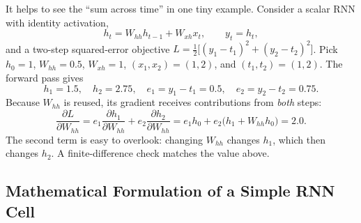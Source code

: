 \begin{tcolorbox}[summarybox, title={Numeric check: shared weights mean summed gradients}]
It helps to see the ``sum across time'' in one tiny example. Consider a scalar RNN with identity activation,
\[
h_t=W_{hh}h_{t-1}+W_{xh}x_t,\qquad y_t=h_t,
\]
and a two\hyp{}step squared\hyp{}error objective \(L=\frac{1}{2}\big[(y_1-t_1)^2+(y_2-t_2)^2\big]\).
Pick \(h_0=1\), \(W_{hh}=0.5\), \(W_{xh}=1\), \((x_1,x_2)=(1,2)\), and \((t_1,t_2)=(1,2)\). The forward pass gives
\[
h_1=1.5,\quad h_2=2.75,\quad e_1=y_1-t_1=0.5,\quad e_2=y_2-t_2=0.75.
\]
Because \(W_{hh}\) is reused, its gradient receives contributions from \emph{both} steps:
\[
\frac{\partial L}{\partial W_{hh}}
= e_1\frac{\partial h_1}{\partial W_{hh}} + e_2\frac{\partial h_2}{\partial W_{hh}}
= e_1 h_0 + e_2\big(h_1 + W_{hh}h_0\big)
= 2.0.
\]
The second term is easy to overlook: changing \(W_{hh}\) changes \(h_1\), which then changes \(h_2\). A finite\hyp{}difference check matches the value above.
\end{tcolorbox}

\subsection{Mathematical Formulation of a Simple RNN Cell}
\label{sec:rnn_mathematical_formulation_of_a_simple_rnn_cell}

